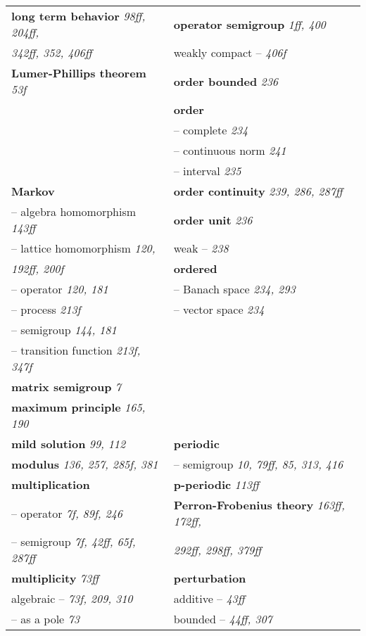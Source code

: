 \begin{longtable}{p{}p{}}
\textbf{long term behavior} \textit{98ff, 204ff,} & \textbf{operator semigroup} \textit{1ff, 400} \\
\quad \textit{342ff, 352, 406ff} & \quad weakly compact -- \textit{406f} \\
\textbf{Lumer-Phillips theorem} \textit{53f} & \textbf{order bounded} \textit{236} \\
& \textbf{order} \\
& \quad -- complete \textit{234} \\
& \quad -- continuous norm \textit{241} \\
& \quad -- interval \textit{235} \\
\textbf{Markov} & \textbf{order continuity} \textit{239, 286, 287ff} \\
\quad -- algebra homomorphism \textit{143ff} & \textbf{order unit} \textit{236} \\
\quad -- lattice homomorphism \textit{120,} & \quad weak -- \textit{238} \\
\quad\quad \textit{192ff, 200f} & \textbf{ordered} \\
\quad -- operator \textit{120, 181} & \quad -- Banach space \textit{234, 293} \\
\quad -- process \textit{213f} & \quad -- vector space \textit{234} \\
\quad -- semigroup \textit{144, 181} & \\
\quad -- transition function \textit{213f, 347f} & \\
\textbf{matrix semigroup} \textit{7} & \\
\textbf{maximum principle} \textit{165, 190} & \\
\textbf{mild solution} \textit{99, 112} & \textbf{periodic} \\
\textbf{modulus} \textit{136, 257, 285f, 381} & \quad -- semigroup \textit{10, 79ff, 85, 313, 416} \\
\textbf{multiplication} & \textbf{p-periodic} \textit{113ff} \\
\quad -- operator \textit{7f, 89f, 246} & \textbf{Perron-Frobenius theory} \textit{163ff, 172ff,} \\
\quad -- semigroup \textit{7f, 42ff, 65f, 287ff} & \quad \textit{292ff, 298ff, 379ff} \\
\textbf{multiplicity} \textit{73ff} & \textbf{perturbation} \\
\quad algebraic -- \textit{73f, 209, 310} & \quad additive -- \textit{43ff} \\
\quad -- as a pole \textit{73} & \quad bounded -- \textit{44ff, 307} \\

\end{longtable}
